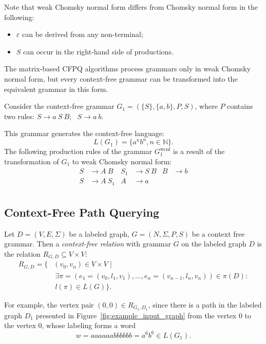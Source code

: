 Note that weak Chomsky normal form differs from Chomsky normal form in the following:
\begin{itemize}
    \item $\varepsilon$ can be derived from any non-terminal;
    \item $S$ can occur in the right-hand side of productions.
\end{itemize}

The matrix-based CFPQ algorithms process grammars only in weak Chomsky normal form, but every context-free grammar can be transformed into the equivalent grammar in this form.

Consider the context-free grammar $G_1=(\{S\},\{a, b\}, P, S)$, where $P$ contains two rules:
$S \rightarrow a \ S \ B; \ \ \ 
S \rightarrow a \ b
$.

This grammar generates the context-free language: $$L(G_1) = \{a^nb^n, n \in \mathbb{N}\}.$$
The following production rules of the grammar $G_1^{\text{wcnf}}$ is a result of the transformation of $G_1$ to weak Chomsky normal form:
\begin{align*}
S& \to A \ B   & S_1& \to S \ B   & B& \to b  \\
S& \to A \ S_1 & A& \to a &&  \\
\end{align*}


\subsection{Context-Free Path Querying}

\begin{definition}
Let $D = (V, E, \Sigma)$ be a labeled graph, $G = (N, \Sigma, P, S)$ be a context free grammar. Then a \emph{context-free relation} with grammar $G$ on the labeled graph $D$ is the relation $R_{G, D} \subseteq V \times V$:
\begin{equation*} \label{eq1}
\begin{split}
R_{G, D} = \{ &(v_0, v_n) \in V \times V  \mid \\ &\ \exists \pi = (e_1 = (v_0, l_1, v_1), \ldots, e_n = (v_{n-1}, l_n, v_n)) \in \pi(D): \\
      &\ l(\pi) \in L(G) \}.
\end{split}
\end{equation*}
\end{definition}

For example, the vertex pair $(0,0) \in R_{G_1, D_1}$, since there is a path in the labeled graph $D_1$ presented in Figure~\ref{fig:example_input_graph} from the vertex $0$ to the vertex $0$, whose labeling forms a word $$w = aaaaaabbbbbb = a^6b^6 \in L(G_1).$$

